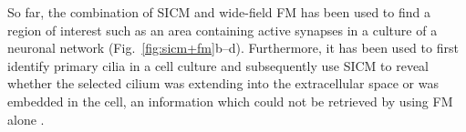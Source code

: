 So far, the combination of SICM and wide-field FM has been used to find a
region of interest such as an area containing active synapses in a culture of
a neuronal network \cite{Novak2013,Scheenen2015}
(Fig.~\ref{fig:sicm+fm}b--d). Furthermore, it has been used to first identify
primary cilia in a cell culture and subsequently use SICM to reveal whether
the selected cilium was extending into the extracellular space or was embedded
in the cell, an information which could not be retrieved by using FM alone
\cite{Zhou2018}.




